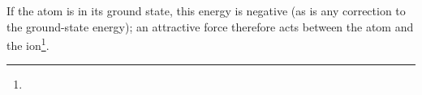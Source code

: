 If the atom is in its ground state, this energy is negative (as is any correction to the ground-state energy); an attractive force therefore acts between the atom and the ion\footnote{%
%
%
%
%
}.
